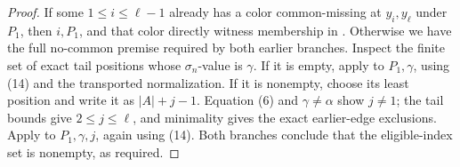 \begin{proof}
If some \(1\le i\le\ell-1\) already has a color common-missing at
\(y_i,y_\ell\) under \(P_1\), then \(i,P_1\), and that color directly
witness membership in
.  Otherwise we have the
full no-common premise required by both earlier branches.  Inspect the
finite set of exact tail positions whose \(\sigma_n\)-value is
\(\gamma\).  If it is empty, apply
 to
\(P_1,\gamma\), using (14) and the transported normalization.  If it is
nonempty, choose its least position and write it as
\(|A|+j-1\).  Equation (6) and \(\gamma\ne\alpha\) show \(j\ne1\);
the tail bounds give \(2\le j\le\ell\), and minimality gives the exact
earlier-edge exclusions.  Apply
 to
\(P_1,\gamma,j\), again using (14).  Both branches conclude that the
eligible-index set is nonempty, as required.
\end{proof}
